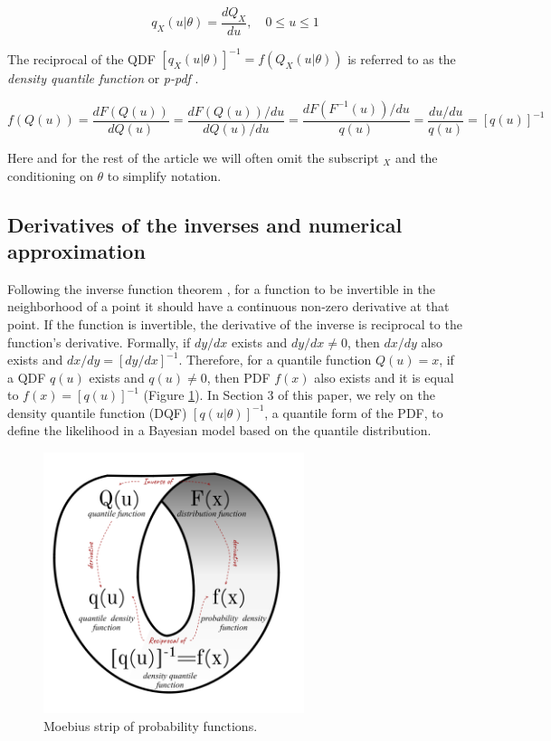 \documentclass[ba]{imsart}
\numberwithin{equation}{section}
\theoremstyle{plain}
\begin{document}
\[
q_X(u|\theta)=\frac{dQ_X}{du}, \quad 0 \leq u \leq 1
\]

The reciprocal of the QDF \([q_X(u|\theta)]^{-1}=f(Q_X(u|\theta))\) is referred to as the \emph{density quantile function} \citep{parzen1980DataModelingUsing} or \emph{p-pdf} \citep{gilchrist2000StatisticalModellingQuantile}.

\[
f(Q(u))=\frac{dF(Q(u))}{dQ(u)} = \frac{dF(Q(u))/du}{dQ(u)/du}=\frac{dF(F^{-1}(u))/du}{q(u)}=\frac{du/du}{q(u)}=[q(u)]^{-1}
\]

Here and for the rest of the article we will often omit the subscript \(_X\) and the conditioning on \(\theta\) to simplify notation.

\hypertarget{derivatives-of-the-inverses-and-numerical-approximation}{%
\subsection{Derivatives of the inverses and numerical approximation}\label{derivatives-of-the-inverses-and-numerical-approximation}}

Following the inverse function theorem \citep{price1984InverseFunctionTheorem}, for a function to be invertible in the neighborhood of a point it should have a continuous non-zero derivative at that point. If the function is invertible, the derivative of the inverse is reciprocal to the function's derivative. Formally, if \(dy/dx\) exists and \(dy/dx \neq 0\), then \(dx/dy\) also exists and \(dx/dy=[dy/dx]^{-1}\). Therefore, for a quantile function \(Q(u)=x\), if a QDF \(q(u)\) exists and \(q(u)\neq0\), then PDF \(f(x)\) also exists and it is equal to \(f(x)=[q(u)]^{-1}\) (Figure \ref{fig:moebius-chart}). In Section 3 of this paper, we rely on the density quantile function (DQF) \([q(u|\theta)]^{-1}\), a quantile form of the PDF, to define the likelihood in a Bayesian model based on the quantile distribution.

\begin{figure}

{\centering \includegraphics[width=3in]{img/moebius-loop} 

}

\caption{Moebius strip of probability functions.}\label{fig:moebius-chart}
\end{figure}
\end{document}

